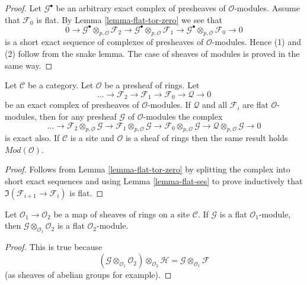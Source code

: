 \begin{proof}
Let $\mathcal{G}^\bullet$ be an arbitrary exact complex of presheaves
of $\mathcal{O}$-modules. Assume that $\mathcal{F}_0$ is flat.
By Lemma \ref{lemma-flat-tor-zero} we see that
$$
0 \to
\mathcal{G}^\bullet \otimes_{p, \mathcal{O}} \mathcal{F}_2 \to
\mathcal{G}^\bullet \otimes_{p, \mathcal{O}} \mathcal{F}_1 \to
\mathcal{G}^\bullet \otimes_{p, \mathcal{O}} \mathcal{F}_0 \to 0
$$
is a short exact sequence of complexes of presheaves of
$\mathcal{O}$-modules. Hence (1) and (2) follow from the snake lemma.
The case of sheaves of modules is proved in the same way.
\end{proof}

\begin{lemma}
\label{lemma-flat-resolution-of-flat}
Let $\mathcal{C}$ be a category.
Let $\mathcal{O}$ be a presheaf of rings.
Let
$$
\ldots \to
\mathcal{F}_2 \to
\mathcal{F}_1 \to
\mathcal{F}_0 \to
\mathcal{Q} \to 0
$$
be an exact complex of presheaves of $\mathcal{O}$-modules.
If $\mathcal{Q}$ and all $\mathcal{F}_i$ are flat $\mathcal{O}$-modules,
then for any presheaf $\mathcal{G}$ of $\mathcal{O}$-modules the
complex
$$
\ldots \to
\mathcal{F}_2 \otimes_{p, \mathcal{O}} \mathcal{G} \to
\mathcal{F}_1 \otimes_{p, \mathcal{O}} \mathcal{G} \to
\mathcal{F}_0 \otimes_{p, \mathcal{O}} \mathcal{G} \to
\mathcal{Q} \otimes_{p, \mathcal{O}} \mathcal{G} \to 0
$$
is exact also. If $\mathcal{C}$ is a site and $\mathcal{O}$ is a
sheaf of rings then the same result holds $\textit{Mod}(\mathcal{O})$.
\end{lemma}

\begin{proof}
Follows from Lemma \ref{lemma-flat-tor-zero} by splitting the complex
into short exact sequences and using Lemma \ref{lemma-flat-ses} to
prove inductively that $\Im(\mathcal{F}_{i + 1} \to \mathcal{F}_i)$
is flat.
\end{proof}

\begin{lemma}
\label{lemma-flat-change-of-rings}
Let $\mathcal{O}_1 \to \mathcal{O}_2$ be a map of sheaves
of rings on a site $\mathcal{C}$. If $\mathcal{G}$ is a
flat $\mathcal{O}_1$-module, then
$\mathcal{G} \otimes_{\mathcal{O}_1} \mathcal{O}_2$
is a flat $\mathcal{O}_2$-module.
\end{lemma}

\begin{proof}
This is true because
$$
(\mathcal{G} \otimes_{\mathcal{O}_1} \mathcal{O}_2)
\otimes_{\mathcal{O}_2} \mathcal{H}
=
\mathcal{G} \otimes_{\mathcal{O}_1} \mathcal{F}
$$
(as sheaves of abelian groups for example).
\end{proof}

